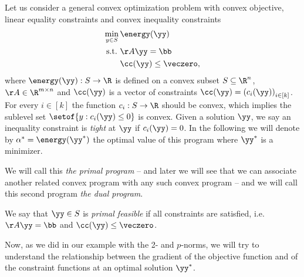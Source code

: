 Let us consider a general convex optimization problem with convex objective, linear equality constraints and convex inequality constraints
\begin{align}
  \label{eq:primalprob}
     \min_{y \in S}{} & \energy(\yy) \\ \nonumber
\text{s.t.}\  & \AA\yy = \bb \\ \nonumber
              & \cc(\yy) \leq \veczero,
\end{align}
where $\energy(\yy): S \rightarrow \R$ is defined on a convex subset $S \subseteq \R^n$, $\AA \in \R^{m\times n}$
and $\cc(\yy)$ is a vector of constraints $\cc(\yy) = \left(c_i(\yy)\right)_{i \in [k]}$.
For every $i \in [k]$ the function $c_i: S \rightarrow \R$ should be convex,
which implies the sublevel set $\setof{y : c_i(\yy) \leq 0 }$ is
convex.
Given a solution $\yy$, we say an inequality constraint is
\emph{tight} at $\yy$ if $c_i(\yy) = 0$.
In the following we will denote by $\alpha^* = \energy(\yy^*)$ the optimal value of this program where $\yy^*$ is a minimizer.

We will call this \emph{the primal program} -- and later we will see
that we can associate another related convex program with any such
convex program -- and we will call this second program \emph{the dual program}.

\begin{definition}
We say that $\yy \in S$ is \emph{primal feasible} if all constraints are satisfied, i.e.~$\AA\yy = \bb$ and $\cc(\yy) \leq \veczero$.
\end{definition}

Now, as we did in our example with the 2- and $p$-norms, we will try
to understand the relationship between the gradient of the objective
function and of the constraint functions at an optimal solution $\yy^*$.

